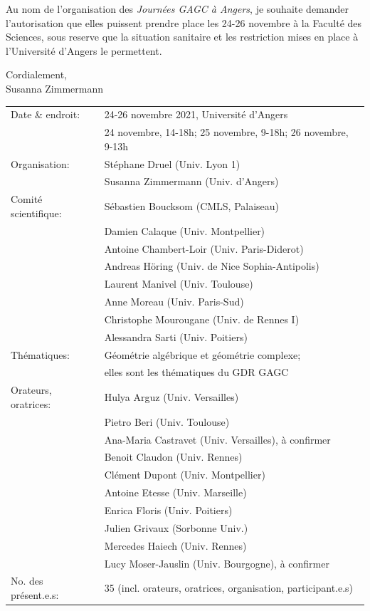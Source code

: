 \documentclass[12pt]{amsart}
\begin{document}
Au nom de l'organisation des {\em Journées GAGC à Angers}, je souhaite demander l'autorisation que elles puissent prendre place les 24-26 novembre à la Faculté des Sciences, sous reserve que la situation sanitaire et les restriction mises en place à l'Université d'Angers le permettent. \smallskip


 Cordialement, \\
Susanna Zimmermann\vspace{1.2cm}%




\noindent\begin{tabular}{ l l }
Date \& endroit: & 24-26 novembre 2021, Université d'Angers\\
&24 novembre, 14-18h; 25 novembre, 9-18h; 26 novembre, 9-13h\\[6pt]
Organisation: & Stéphane Druel (Univ. Lyon 1) \\ 
&Susanna Zimmermann (Univ. d'Angers)\\[6pt] 
Comité scientifique: &  Sébastien Boucksom (CMLS, Palaiseau) \\
&Damien Calaque (Univ. Montpellier)\\
& Antoine Chambert-Loir (Univ. Paris-Diderot)\\
& Andreas Höring (Univ. de Nice Sophia-Antipolis)\\
&Laurent Manivel (Univ. Toulouse)\\
& Anne Moreau (Univ. Paris-Sud)\\ 
&Christophe Mourougane (Univ. de Rennes I) \\
&Alessandra Sarti (Univ. Poitiers)\\[6pt]
Thématiques: & Géométrie algébrique et géométrie complexe;\\
& elles sont les thématiques du GDR GAGC\\[6pt]
Orateurs, oratrices: 
&Hulya Arguz (Univ. Versailles)\\
&Pietro Beri (Univ. Toulouse)\\
& Ana-Maria Castravet (Univ. Versailles), à confirmer\\
&Benoit Claudon (Univ. Rennes)\\
&Clément Dupont (Univ. Montpellier)\\
&Antoine Etesse (Univ. Marseille)\\
&Enrica Floris (Univ. Poitiers)\\
&Julien Grivaux (Sorbonne Univ.)\\
&Mercedes Haiech (Univ. Rennes)\\
&Lucy Moser-Jauslin (Univ. Bourgogne), à confirmer\\[6pt]
No. des présent.e.s:& 35 (incl. orateurs, oratrices, organisation, participant.e.s)
\end{tabular}
\end{document}
